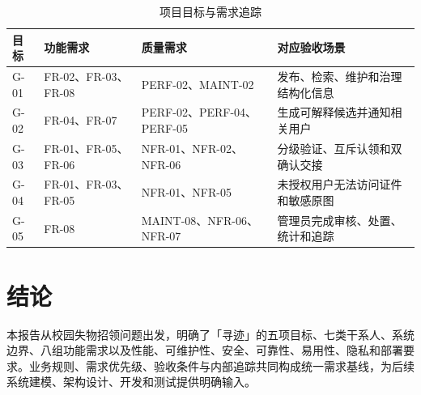 \begin{table}[H]
  \centering
  \caption{项目目标与需求追踪}
  \begin{tabularx}{\textwidth}{L{1.6cm} L{3.0cm} L{4.2cm} Y}
    \toprule
    目标 & 功能需求 & 质量需求 & 对应验收场景 \\
    \midrule
    G-01 & FR-02、FR-03、FR-08 & PERF-02、MAINT-02 & 发布、检索、维护和治理结构化信息 \\
    G-02 & FR-04、FR-07 & PERF-02、PERF-04、PERF-05 & 生成可解释候选并通知相关用户 \\
    G-03 & FR-01、FR-05、FR-06 & NFR-01、NFR-02、NFR-06 & 分级验证、互斥认领和双确认交接 \\
    G-04 & FR-01、FR-03、FR-05 & NFR-01、NFR-05 & 未授权用户无法访问证件和敏感原图 \\
    G-05 & FR-08 & MAINT-08、NFR-06、NFR-07 & 管理员完成审核、处置、统计和追踪 \\
    \bottomrule
  \end{tabularx}
\end{table}

\section{结论}

本报告从校园失物招领问题出发，明确了「寻迹」的五项目标、七类干系人、系统边界、八组功能需求以及性能、可维护性、安全、可靠性、易用性、隐私和部署要求。业务规则、需求优先级、验收条件与内部追踪共同构成统一需求基线，为后续系统建模、架构设计、开发和测试提供明确输入。
